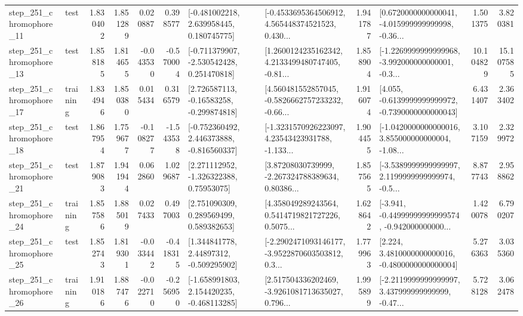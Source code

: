 \begin{tabular}{llrrrrllrlrr}
  step\_251\_chromophore\_11 &      test &      1.830402 &    1.851289 &      0.020887 &  0.398577 &    [-0.481002218, 2.639958445, 0.180745775] &  [-0.4533695364506912, 4.565448374521523, 0.430... &       1.941787 &  [0.6720000000000041, -4.015999999999998, -0.36... &            1.501375 &          3.820381 \\
  step\_251\_chromophore\_13 &      test &      1.858185 &    1.814655 &     -0.043530 & -0.570004 &   [-0.711379907, -2.530542428, 0.251470818] &  [1.2600124235162342, 4.2133499480747405, -0.81... &       1.858904 &  [-1.2269999999999968, -3.992000000000001, -0.3... &           10.104829 &         15.107585 \\
  step\_251\_chromophore\_17 &  training &      1.834946 &    1.850380 &      0.015434 &  0.316579 &    [2.726587113, -0.16583258, -0.299874818] &  [4.560481552857045, -0.5826662757233232, -0.66... &       1.916074 &  [4.055, -0.6139999999999972, -0.7390000000000043] &            6.431407 &          2.363402 \\
  step\_251\_chromophore\_18 &      test &      1.867954 &    1.759677 &     -0.108277 & -1.543538 &   [-0.752360492, 2.446373888, -0.816560337] &  [-1.3231570926223097, 4.23543423931788, -1.133... &       1.904455 &  [-1.0420000000000016, 3.855000000000004, -1.08... &            3.107159 &          2.329972 \\
  step\_251\_chromophore\_21 &      test &      1.879083 &    1.941944 &      0.062860 &  1.029687 &     [2.271112952, -1.326322388, 0.75953075] &  [3.87208030739999, -2.267324788389634, 0.80386... &       1.857565 &  [-3.5389999999999997, 2.1199999999999974, -0.5... &            8.877743 &          2.958862 \\
  step\_251\_chromophore\_24 &  training &      1.857586 &    1.885019 &      0.027433 &  0.497003 &     [2.751090309, 0.289569499, 0.589382653] &  [4.358049289243564, 0.5414719821727226, 0.5075... &       1.628642 &  [-3.941, -0.44999999999999574, -0.942000000000... &            1.420078 &          6.790207 \\
  step\_251\_chromophore\_25 &      test &      1.852743 &    1.819301 &     -0.033442 & -0.418315 &     [1.344841778, 2.44897312, -0.509295902] &  [-2.2902471093146177, -3.9522870603503812, 0.3... &       1.779963 &   [2.224, 3.4810000000000016, -0.4800000000000004] &            5.276363 &          3.035360 \\
  step\_251\_chromophore\_26 &  training &      1.910186 &    1.887476 &     -0.022710 & -0.256950 &   [-1.658991803, 2.154420235, -0.468113285] &  [2.517504336202469, -3.9261081713635027, 0.796... &       1.995899 &  [-2.2119999999999997, 3.437999999999999, -0.47... &            5.728128 &          3.062478 \\

\end{tabular}
